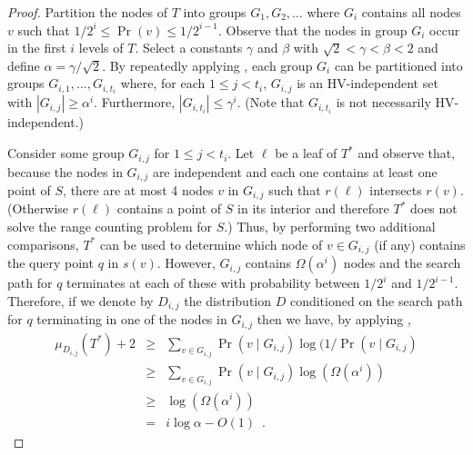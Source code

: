 \documentclass[lotsofwhite,charterfonts]{patmorin}
\begin{document}
\begin{proof}
Partition the nodes of $T$ into groups $G_1,G_2,\ldots$ where $G_i$
contains all nodes $v$ such that $1/2^{i} \le \Pr(v) \le 1/2^{i-1}$.
Observe that the nodes in group $G_i$ occur in the first $i$ levels of
$T$.  Select a constants $\gamma$ and $\beta$ with $\sqrt{2} < \gamma
< \beta < 2$ and define $\alpha=\gamma/\sqrt{2}$.  By
repeatedly applying , each group $G_i$ can be
partitioned into groups $G_{i,1},\ldots,G_{i,t_i}$ where, for each $1
\le j < t_i$, $G_{i,j}$ is an HV-independent set with $|G_{i,j}|
\ge \alpha^i$.  Furthermore, $|G_{i,t_i}| \le \gamma^i$. (Note that
$G_{i,t_i}$ is not necessarily HV-independent.)

Consider some group $G_{i,j}$ for $1\le j < t_i$.  Let $\ell$ be a
leaf of $T^*$ and observe that, because the nodes in $G_{i,j}$ are
independent and each one contains at least one point of $S$, there are
at most 4 nodes $v$ in $G_{i,j}$ such that $r(\ell)$ intersects
$r(v)$.  (Otherwise $r(\ell)$ contains a point of $S$ in its interior
and therefore $T^*$ does not solve the range counting problem for $S$.)
Thus, by performing two additional comparisons, $T^*$ can be used to
determine which node of $v\in G_{i,j}$ (if any) contains the query
point $q$ in $s(v)$.  However, $G_{i,j}$ contains $\Omega(\alpha^i)$
nodes and the search path for $q$ terminates at each of these with
probability between $1/2^i$ and $1/2^{i-1}$.  Therefore, if we denote
by $D_{i,j}$ the distribution $D$ conditioned on the search path for
$q$ terminating in one of the nodes in $G_{i,j}$ then we have, by
applying
,
\begin{eqnarray*}
   \mu_{D_{i,j}}(T^*) + 2 
    & \ge & \sum_{v\in G_{i,j}}\Pr(v\mid G_{i,j})\log(1/\Pr(v\mid G_{i,j}) \\
    & \ge & \sum_{v\in G_{i,j}}\Pr(v\mid G_{i,j})\log(\Omega(\alpha^i)) \\
    & \ge & \log(\Omega(\alpha^i)) \\
    & = & i\log\alpha - O(1) \enspace .
\end{eqnarray*}


\end{proof}
\end{document}
